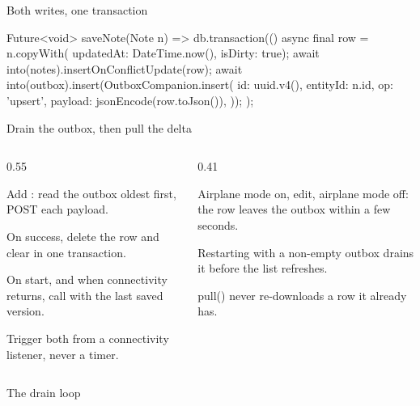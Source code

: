 \documentclass[10pt,aspectratio=169,t]{beamer}
\begin{document}
\begin{frame}[fragile,eyebrow=Task I]{Both writes, one transaction}
  \vskip 1mm
\begin{dart}
Future<void> saveNote(Note n) => db.transaction(() async {
  final row = n.copyWith(
      updatedAt: DateTime.now(), isDirty: true);
  await into(notes).insertOnConflictUpdate(row);
  await into(outbox).insert(OutboxCompanion.insert(
    id: uuid.v4(), entityId: n.id,
    op: 'upsert', payload: jsonEncode(row.toJson()),
  ));
});
\end{dart}
\end{frame}

\begin{frame}[eyebrow=Task II]{Drain the outbox, then pull the delta}
  \begin{columns}[T]
    \begin{column}{0.55\textwidth}
      \begin{steps}
        \item Add : read the outbox oldest first, POST each payload.
        \item On success, delete the row and clear  in one transaction.
        \item On start, and when connectivity returns, call  with the last saved version.
        \item Trigger both from a connectivity listener, never a timer.
      \end{steps}
    \end{column}
    \begin{column}{0.41\textwidth}
      \begin{checklist}
        \item Airplane mode on, edit, airplane mode off: the row leaves the outbox within a few seconds.
        \item Restarting with a non-empty outbox drains it before the list refreshes.
        \item pull() never re-downloads a row it already has.
      \end{checklist}
    \end{column}
  \end{columns}
\end{frame}

\begin{frame}[fragile,eyebrow=Task II]{The drain loop}
\end{frame}
\end{document}
